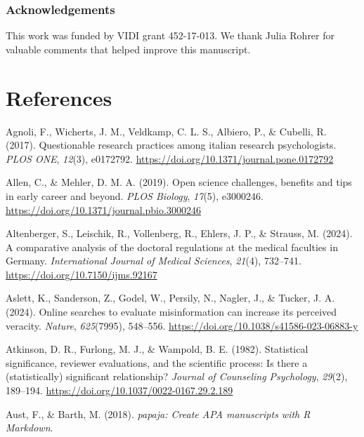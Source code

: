 \documentclass[
  british,
  a4paper,
  ,man,mask,floatsintext]{apa6}
\newlength{\cslhangindent}
\newenvironment{CSLReferences}[2] %
 {\begin{list}{}{%
  \setlength{\itemindent}{0pt}
  \setlength{\leftmargin}{0pt}
  \setlength{\parsep}{0pt}
  \ifodd #1
   \setlength{\leftmargin}{\cslhangindent}
   \setlength{\itemindent}{-1\cslhangindent}
  \fi
  \setlength{\itemsep}{#2\baselineskip}}}
 {\end{list}}
\begin{document}
\subsubsection{Acknowledgements}\label{acknowledgements}

This work was funded by VIDI grant 452-17-013. We thank Julia Rohrer for valuable comments that helped improve this manuscript.

\section{References}\label{references}

\setlength{\parindent}{-0.2in}
\setlength{\leftskip}{0.2in}


\label{refs}
\begin{CSLReferences}{1}{0}
Agnoli, F., Wicherts, J. M., Veldkamp, C. L. S., Albiero, P., \& Cubelli, R. (2017). Questionable research practices among italian research psychologists. \emph{PLOS ONE}, \emph{12}(3), e0172792. \url{https://doi.org/10.1371/journal.pone.0172792}

Allen, C., \& Mehler, D. M. A. (2019). Open science challenges, benefits and tips in early career and beyond. \emph{PLOS Biology}, \emph{17}(5), e3000246. \url{https://doi.org/10.1371/journal.pbio.3000246}

Altenberger, S., Leischik, R., Vollenberg, R., Ehlers, J. P., \& Strauss, M. (2024). A comparative analysis of the doctoral regulations at the medical faculties in {Germany}. \emph{International Journal of Medical Sciences}, \emph{21}(4), 732--741. \url{https://doi.org/10.7150/ijms.92167}

Aslett, K., Sanderson, Z., Godel, W., Persily, N., Nagler, J., \& Tucker, J. A. (2024). Online searches to evaluate misinformation can increase its perceived veracity. \emph{Nature}, \emph{625}(7995), 548--556. \url{https://doi.org/10.1038/s41586-023-06883-y}

Atkinson, D. R., Furlong, M. J., \& Wampold, B. E. (1982). Statistical significance, reviewer evaluations, and the scientific process: {Is} there a (statistically) significant relationship? \emph{Journal of Counseling Psychology}, \emph{29}(2), 189--194. \url{https://doi.org/10.1037/0022-0167.29.2.189}

Aust, F., \& Barth, M. (2018). \emph{{papaja}: {Create APA} manuscripts with {R Markdown}}.


\end{CSLReferences}
\end{document}
